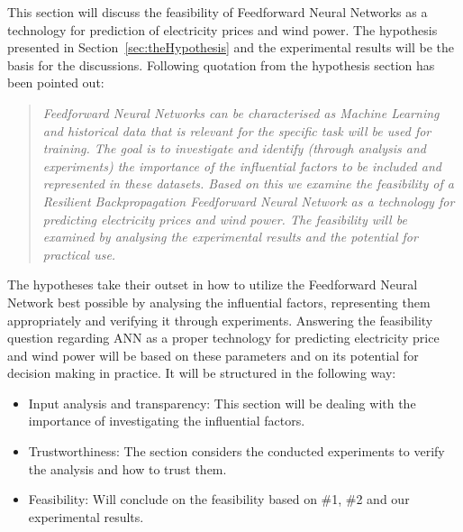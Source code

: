 This section will discuss the feasibility of Feedforward Neural Networks as a technology for prediction of electricity prices and wind power. The hypothesis presented in Section~\ref{sec:theHypothesis} and the experimental results will be the basis for the discussions. Following quotation from the hypothesis section has been pointed out:

\begin{quotation}
\textit{Feedforward Neural Networks can be characterised as Machine Learning\cite{18} and historical data that is relevant for the specific task will be used for training. The goal is to investigate and identify (through analysis and experiments) the importance of the influential factors to be included and represented in these datasets. Based on this we examine the feasibility of a Resilient Backpropagation Feedforward Neural Network as a technology for predicting electricity prices and wind power. The feasibility will be examined by analysing the experimental results and the potential for practical use.}
\end{quotation}

\noindent The hypotheses take their outset in how to utilize the Feedforward Neural Network best possible by analysing the influential factors, representing them appropriately and verifying it through experiments. Answering the feasibility question regarding ANN as a proper technology for predicting electricity price and wind power will be based on these parameters and on its potential for decision making in practice. It will be structured in the following way:

\begin{itemize}
\item Input analysis and transparency: This section will be dealing with the importance of investigating the influential factors.
\item Trustworthiness: The section considers the conducted experiments to verify the analysis and how to trust them.
\item Feasibility: Will conclude on the feasibility based on \#1, \#2 and our experimental results.
\end{itemize}


